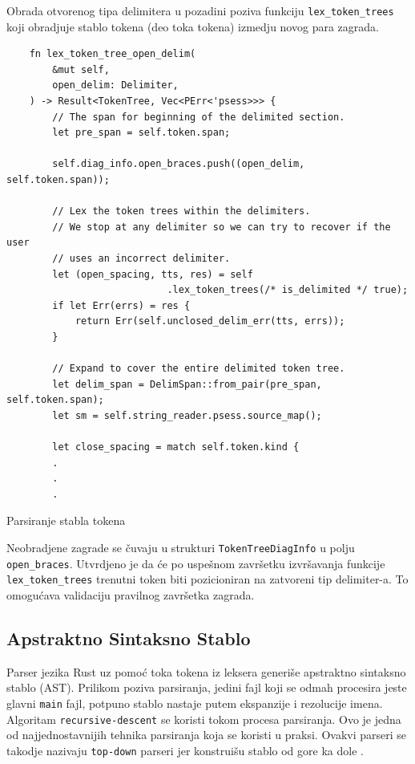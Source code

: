\documentclass[11pt]{article}
\begin{document}
Obrada otvorenog tipa delimitera u pozadini poziva funkciju \verb|lex_token_trees| koji obradjuje
stablo tokena (deo toka tokena) izmedju novog para zagrada.
\begin{listing}[H]
\begin{verbatim}
    fn lex_token_tree_open_delim(
        &mut self,
        open_delim: Delimiter,
    ) -> Result<TokenTree, Vec<PErr<'psess>>> {
        // The span for beginning of the delimited section.
        let pre_span = self.token.span;

        self.diag_info.open_braces.push((open_delim, self.token.span));

        // Lex the token trees within the delimiters.
        // We stop at any delimiter so we can try to recover if the user
        // uses an incorrect delimiter.
        let (open_spacing, tts, res) = self
                            .lex_token_trees(/* is_delimited */ true);
        if let Err(errs) = res {
            return Err(self.unclosed_delim_err(tts, errs));
        }

        // Expand to cover the entire delimited token tree.
        let delim_span = DelimSpan::from_pair(pre_span, self.token.span);
        let sm = self.string_reader.psess.source_map();

        let close_spacing = match self.token.kind {
        .
        .
        .
\end{verbatim}
\caption{Parsiranje stabla tokena}
\end{listing}

Neobradjene zagrade se čuvaju u strukturi \verb|TokenTreeDiagInfo| u polju \verb|open_braces|.
Utvrdjeno je da će po uspešnom završetku izvršavanja funkcije \verb|lex_token_trees| 
trenutni token biti pozicioniran na zatvoreni tip delimiter-a. To omogućava validaciju 
pravilnog završetka zagrada.

\newpage
\subsection{Apstraktno Sintaksno Stablo}

Parser jezika Rust uz pomoć toka tokena iz leksera generiše apstraktno sintaksno stablo (AST). 
Prilikom poziva parsiranja, jedini fajl koji se odmah procesira jeste glavni \verb|main| fajl, potpuno stablo
nastaje putem ekspanzije i rezolucije imena.
Algoritam \verb|recursive-descent| se koristi tokom procesa parsiranja. Ovo je jedna od najjednostavnijih
tehnika parsiranja koja se koristi u praksi. Ovakvi parseri se takodje nazivaju \verb|top-down| parseri 
jer konstruišu stablo od gore ka dole \cite{parsing}. 
\end{document}
